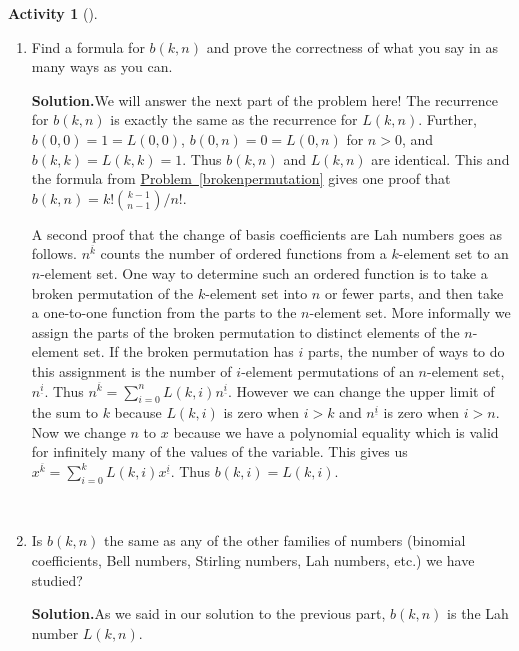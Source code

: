 \documentclass[10pt,]{book}
\theoremstyle{plain}
\theoremstyle{definition}
\newtheorem{activity}[project]{Activity}
\numberwithin{equation}{chapter}
\begin{document}
\begin{activity}[]
\begin{enumerate}[label=(\alph*)]
~\par
\item Find a formula for \(b(k,n)\) and prove the correctness of what you say in as many ways as you can.%
\par\medskip\noindent%
\textbf{Solution.}\quad We will answer the next part of the problem here! The recurrence for \(b(k,n)\) is exactly the same as the recurrence for \(L(k,n)\). Further, \(b(0,0)=1=L(0,0)\), \(b(0,n) = 0=L(0,n)\) for \(n>0\), and \(b(k,k)=L(k,k) =1\). Thus \(b(k,n)\) and \(L(k,n)\) are identical. This and the formula from \hyperref[brokenpermutation]{Problem~\ref{brokenpermutation}} gives one proof that \(b(k,n)=k!{k-1\choose n-1}/n!\).%
\par
A second proof that the change of basis coefficients are Lah numbers goes as follows. \(n^{\overline{k}}\) counts the number of ordered functions from a \(k\)-element set to an \(n\)-element set. One way to determine such an ordered function is to take a broken permutation of the \(k\)-element set into \(n\) or fewer parts, and then take a one-to-one function from the parts to the \(n\)-element set. More informally we assign the parts of the broken permutation to distinct elements of the \(n\)-element set. If the broken permutation has \(i\) parts, the number of ways to do this assignment is the number of \(i\)-element permutations of an \(n\)-element set, \(n^{\underline{i}}\). Thus \(n^{\overline{k}}=\sum_{i=0}^n L(k,i)n^{\underline{i}}\). However we can change the upper limit of the sum to \(k\) because \(L(k,i)\) is zero when \(i>k\) and \(n^{\underline{i}}\) is zero when \(i>n\). Now we change \(n\) to \(x\) because we have a polynomial equality which is valid for infinitely many of the values of the variable. This gives us \(x^{\overline{k}}=\sum_{i=0}^k L(k,i)x^{\underline{i}}\). Thus \(b(k,i) =
L(k,i)\).%

~\par
\item Is \(b(k,n)\) the same as any of the other families of numbers (binomial coefficients, Bell numbers, Stirling numbers, Lah numbers, etc.) we have studied?%
\par\medskip\noindent%
\textbf{Solution.}\quad As we said in our solution to the previous part, \(b(k,n)\) is the Lah number \(L(k,n)\).%


\end{enumerate}
\end{activity}
\end{document}
